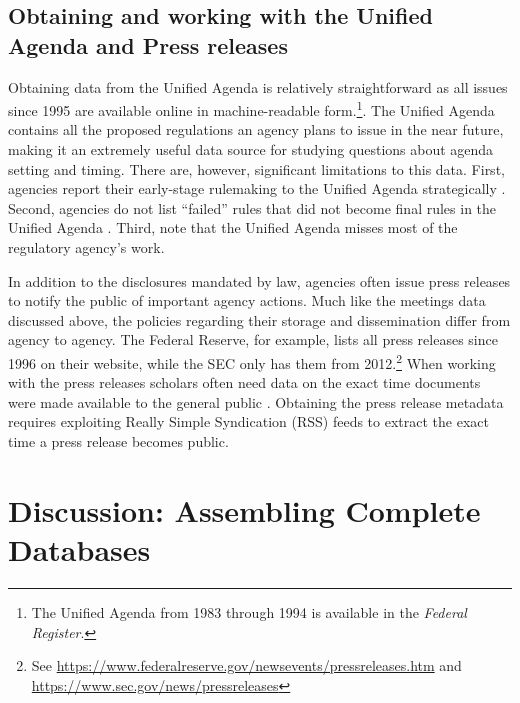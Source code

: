 \documentclass[
      12pt,
        ]{article}
\begin{document}
\hypertarget{obtaining-and-working-with-the-unified-agenda-and-press-releases}{%
\subsection*{Obtaining and working with the Unified Agenda and Press
releases}\label{obtaining-and-working-with-the-unified-agenda-and-press-releases}}

Obtaining data from the Unified Agenda is relatively straightforward as
all issues since 1995 are available online in machine-readable
form.\footnote{The Unified Agenda from 1983 through 1994 is available in
  the \emph{Federal Register}.}. The Unified Agenda contains all the
proposed regulations an agency plans to issue in the near future, making
it an extremely useful data source for studying questions about agenda
setting and timing. There are, however, significant limitations to this
data. First, agencies report their early-stage rulemaking to the Unified
Agenda strategically \citep{NouSCLR2016}. Second, agencies do not list
``failed'' rules that did not become final rules in the Unified Agenda
\citep{YackeeGWLR2012}. Third, \citet{CoglianeseALR2016} note that the
Unified Agenda misses most of the regulatory agency's work.

In addition to the disclosures mandated by law, agencies often issue
press releases to notify the public of important agency actions. Much
like the meetings data discussed above, the policies regarding their
storage and dissemination differ from agency to agency. The Federal
Reserve, for example, lists all press releases since 1996 on their
website, while the SEC only has them from 2012.\footnote{See
  \url{https://www.federalreserve.gov/newsevents/pressreleases.htm} and
  \url{https://www.sec.gov/news/pressreleases}} When working with the
press releases scholars often need data on the exact time documents were
made available to the general public \citep[see, e.g.,][]{LibgoberJOP}.
Obtaining the press release metadata requires exploiting Really Simple
Syndication (RSS) feeds to extract the exact time a press release
becomes public.

\hypertarget{discussion-assembling-complete-databases}{%
\section{Discussion: Assembling Complete
Databases}\label{discussion-assembling-complete-databases}}
\end{document}
